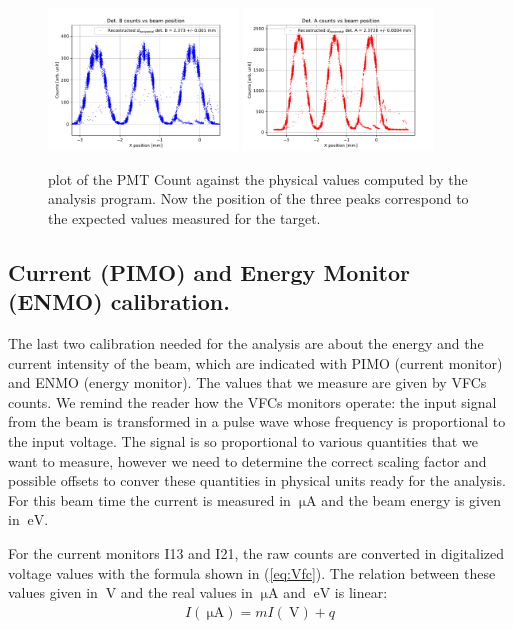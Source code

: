 \begin{figure}[hbtp]
\centering
\includegraphics[width=0.45\textwidth]{Analysis/XcheckB.pdf} 
\includegraphics[width=0.45\textwidth]{Analysis/XcheckA.pdf}
\caption{plot of the PMT Count against the physical values computed by the analysis program. Now the position of the three peaks correspond to the expected values measured for the target.}
\label{fig:CheckHori}
\end{figure}
\newpage

\subsection{Current (PIMO) and Energy Monitor (ENMO) calibration.} \label{CurrentCalibration}

The last two calibration needed for the analysis are about the energy and the current intensity of the beam, which are indicated with PIMO (current monitor) and ENMO (energy monitor). 
The values that we measure are given by VFCs counts. We remind the reader how the VFCs monitors operate: the input signal from the beam is transformed in a pulse wave whose frequency is proportional to the input voltage.  The signal is so proportional to various quantities that we want to measure, however we need to determine the correct scaling factor and possible offsets to conver these quantities in physical units ready for the analysis. For this beam time the current is measured in $\SI{}{\micro \ampere}$ and the beam energy is given in $\SI{}{\electronvolt}$.\smallskip

For the current monitors I13 and I21, the raw counts are converted in digitalized voltage values with the formula shown in (\ref{eq:Vfc}). The relation between these values given in $\SI{}{\volt}$ and the real values in $\SI{}{\micro \ampere}$ and $\SI{}{\electronvolt}$ is linear:
\begin{align*}
I(\SI{}{\micro \ampere}) = m I(\SI{}{\volt}) + q
\end{align*}


